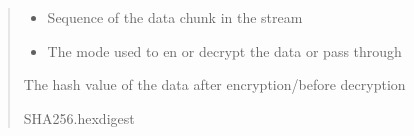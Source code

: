 \documentclass[letterpaper,10pt,english]{sphinxmanual}
\begin{document}
\begin{savenotes}
\begin{fulllineitems}
\begin{savenotes}
\begin{fulllineitems}
\begin{quote}
\begin{description}
\begin{itemize}
\item {} 
\sphinxAtStartPar
{} \textendash{} Sequence of the data chunk in the stream

\item {} 
\sphinxAtStartPar
{} \textendash{} The mode used to en\sphinxhyphen{} or decrypt the data or pass through

\end{itemize}

\sphinxAtStartPar
The hash value of the data after encryption/before decryption

\sphinxAtStartPar
SHA256.hexdigest

\end{description}\end{quote}

\end{fulllineitems}\end{savenotes}


\end{fulllineitems}\end{savenotes}

\end{document}
